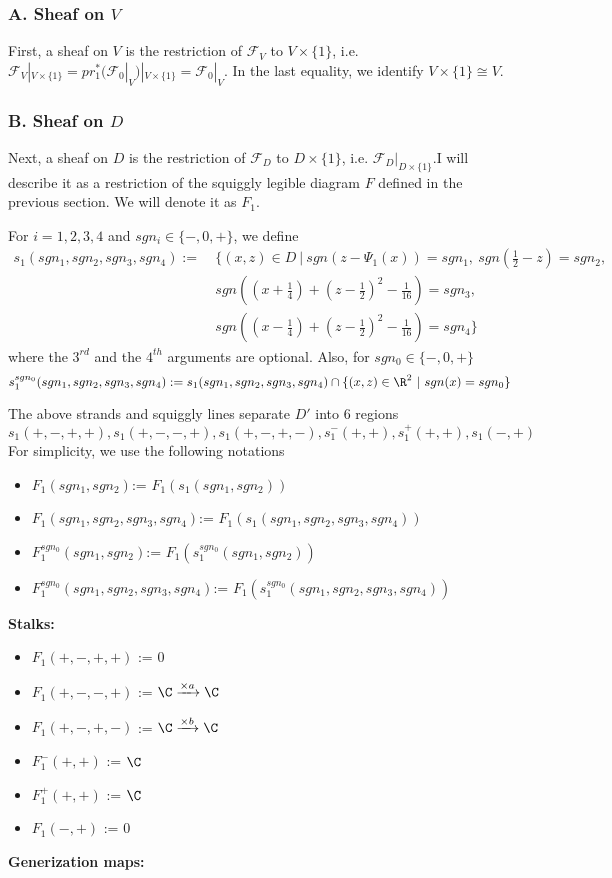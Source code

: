 \subsubsection{A. Sheaf on $V$}
First, a sheaf on $V$ is the restriction of $\mathscr{F}_V$ to $V\times \{1\}$, i.e. $\mathscr{F}_V|_{V\times \{1\}}= pr_1^*(\mathscr{F}_0|_V)|_{V\times \{1\}} = \mathscr{F}_0|_V$. In the last equality, we identify $V\times \{1\} \cong V$.
\subsubsection{B. Sheaf on $D$}
Next, a sheaf on $D$ is the restriction of $\mathscr{F}_D$ to $D\times \{1\}$, i.e. $\mathscr{F}_D |_{D\times \{1\}}$.I will describe it as a restriction of the squiggly legible diagram $F$ defined in the previous section. We will denote it as $F_1$.

\begin{definition}
For $i = 1,2,3,4$ and $sgn_i \in \{-,0,+\}$, we define
\begin{align*}
s_1(sgn_1,sgn_2,sgn_3,sgn_4):=~ &\{(x,z) \in D ~|~ sgn(z-\Psi_1(x))=sgn_1,~ sgn(\frac{1}{2}-z)=sgn_2,\\ 
&sgn((x+\frac{1}{4})+(z-\frac{1}{2})^2 - \frac{1}{16})=sgn_3,\\
&sgn((x-\frac{1}{4})+(z-\frac{1}{2})^2 - \frac{1}{16})=sgn_4 \}
\end{align*}
where the $3^{rd}$ and the $4^{th}$ arguments are optional. Also, for $sgn_0 \in \{-,0,+\}$ \[
s_1^{sgn_0}(sgn_1,sgn_2,sgn_3,sgn_4) := s_1(sgn_1,sgn_2,sgn_3,sgn_4) \cap \{(x,z)\in \R^2 ~|~ sgn(x)=sgn_0 \} 
\]
\end{definition}
The above strands and squiggly lines separate $D'$ into $6$ regions
\[
	s_1(+,-,+,+),s_1(+,-,-,+),s_1(+,-,+,-),s_1^-(+,+),s_1^+(+,+),s_1(-,+)
\]
For simplicity, we use the following notations
\begin{itemize}
\item $F_1(sgn_1,sgn_2)$:= $F_1(s_1(sgn_1,sgn_2))$
\item $F_1(sgn_1,sgn_2,sgn_3,sgn_4)$:= $F_1(s_1(sgn_1,sgn_2,sgn_3,sgn_4))$
\item $F_1^{sgn_0}(sgn_1,sgn_2)$:= $F_1(s_1^{sgn_0}(sgn_1,sgn_2))$
\item $F_1^{sgn_0}(sgn_1,sgn_2,sgn_3,sgn_4)$:= $F_1(s_1^{sgn_0}(sgn_1,sgn_2,sgn_3,sgn_4))$
\end{itemize}
\textbf{Stalks:}

\begin{itemize}
\item $F_1(+,-,+,+)$ := $0$
\item $F_1(+,-,-,+)$ := $\C \xrightarrow{\times a} \C $
\item $F_1(+,-,+,-)$ := $\C \xrightarrow{\times b} \C $
\item $F_1^-(+,+)$ := $\C$
\item $F_1^+(+,+)$ := $\C$
\item $F_1(-,+)$ := $0$
\end{itemize}
\textbf{Generization maps:}

